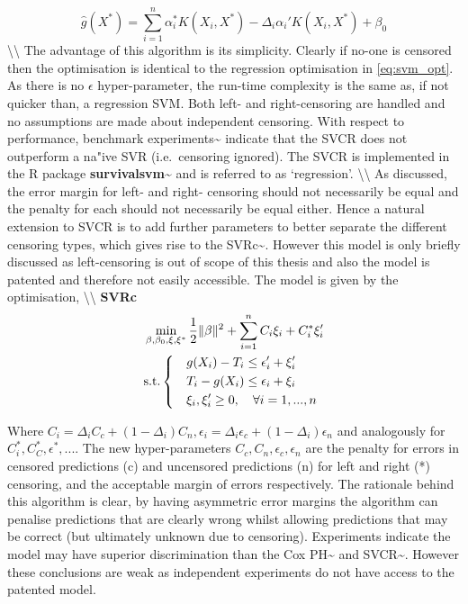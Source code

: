 \documentclass[
  letterpaper,
]{scrbook}
\theoremstyle{plain}
\theoremstyle{definition}
\theoremstyle{remark}
\begin{document}
\[
\hat{g}(X^*) = \sum^n_{i=1} \alpha^*_i K(X_i, X^*) - \Delta_i\alpha_i'K(X_i, X^*) + \beta_0
\] \textbackslash\textbackslash{} The advantage of this algorithm is its
simplicity. Clearly if no-one is censored then the optimisation is
identical to the regression optimisation in \ref{eq:svm_opt}. As there
is no \(\epsilon\) hyper-parameter, the run-time complexity is the same
as, if not quicker than, a regression SVM. Both left- and
right-censoring are handled and no assumptions are made about
independent censoring. With respect to performance, benchmark
experiments\textasciitilde{}\cite{pkgsurvivalsvm} indicate that the SVCR
does not outperform a na"ive SVR (i.e.~censoring ignored). The SVCR is
implemented in the \textsf{R}{} package
\textbf{survivalsvm}\textasciitilde{}\cite{pkgsurvivalsvm} and is
referred to as `regression'. \textbackslash\textbackslash{} As
discussed, the error margin for left- and right- censoring should not
necessarily be equal and the penalty for each should not necessarily be
equal either. Hence a natural extension to SVCR is to add further
parameters to better separate the different censoring types, which gives
rise to the SVRc\textasciitilde{}\cite{Khan2008}. However this model is
only briefly discussed as left-censoring is out of scope of this thesis
and also the model is patented and therefore not easily accessible. The
model is given by the optimisation, \textbackslash\textbackslash{}
\textbf{SVRc}\label{mod:svrc} \[
\begin{aligned}
& \min_{\beta, \beta_0, \xi, \xi^*} \frac{1}{2}\|\beta\|^2 + \sum^n_{i=1} C_i\xi_i + C^*_i\xi'_i \\
& \textrm{s.t.}
\begin{dcases}
& g(X_i) - T_i \leq \epsilon'_i + \xi'_i \\
& T_i - g(X_i) \leq \epsilon_i + \xi_i \\
& \xi_i, \xi_i' \geq 0, \quad \forall i = 1,...,n \\
\end{dcases}
\end{aligned}
\]

Where
\(C_i = \Delta_iC_c + (1-\Delta_i)C_n, \epsilon_i = \Delta_i\epsilon_c + (1-\Delta_i)\epsilon_n\)
and analogously for \(C^*_i, C_C^*, \epsilon^*,...\). The new
hyper-parameters \(C_c, C_n, \epsilon_c, \epsilon_n\) are the penalty
for errors in censored predictions (c) and uncensored predictions (n)
for left and right (*) censoring, and the acceptable margin of errors
respectively. The rationale behind this algorithm is clear, by having
asymmetric error margins the algorithm can penalise predictions that are
clearly wrong whilst allowing predictions that may be correct (but
ultimately unknown due to censoring). Experiments indicate the model may
have superior discrimination than the Cox
PH\textasciitilde{}\cite{Khan2008} and
SVCR\textasciitilde{}\cite{Du2011}. However these conclusions are weak
as independent experiments do not have access to the patented model.
\end{document}
